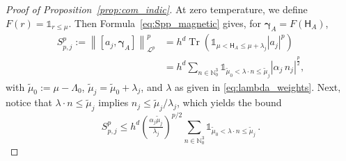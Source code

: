 \documentclass[11pt]{amsart}
\theoremstyle{plain}
\theoremstyle{definition}
\newcommand		{\N}		{\mathbb N}			%
\renewcommand	{\L}		{\mathcal L}		%
\newcommand		\sfH		{\mathsf H}			%
\newcommand		{\lt}			{\left}				%
\newcommand		{\rt}			{\right}			%
\renewcommand	{\(}			{\lt(}
\renewcommand	{\)}			{\rt)}
\newcommand		{\com}[1]		{\lt[{#1}\rt]}		%
\newcommand		{\n}[1]			{\lt\lvert #1 \rt\rvert}
\newcommand		{\nrm}[1]		{\lt\lVert #1\rt\rVert}
\newcommand		{\Nrm}[2]		{\nrm{#1}_{#2}}
\newcommand		{\indic}	{\mathds{1}}		%
\DeclareMathOperator{\tr}		{Tr}				%
\newcommand		{\Tr}[1]		{\tr\!\( #1 \)}		%
\newcommand		{\hd}		{h^d}
\newcommand		{\opgam}	{{\boldsymbol{\gamma}}}	%
\begin{document}
    \begin{proof}[Proof of Proposition~\ref{prop:com_indic}]
        At zero temperature, we define $F(r) = \indic_{r\leq\mu}$. Then Formula~\eqref{eq:Spp_magnetic} gives, for $\opgam_{A} = F(\sfH_A)$,
        \begin{equation}\label{eq:Spp_magnetic_0}
            \begin{aligned}
                S_{p, j}^p := \Nrm{\com{a_j,\opgam_{A}}}{\L^p}^p &= \hd \Tr{\indic_{\mu< \sfH_A\leq \mu+\lambda_j} \n{a_j}^p} \\
                &= \hd\sum_{n\in \N_0^3} \indic_{\tilde{\mu}_0 < \lambda\cdot n \leq \tilde{\mu}_j} \n{\alpha_j \, n_j}^\frac{p}{2},
            \end{aligned}
        \end{equation}
        with $\tilde{\mu}_0 := \mu - \Lambda_0$, $\tilde{\mu}_j = \tilde{\mu}_0 + \lambda_j$, and $\lambda$ as given in \eqref{eq:lambda_weights}.  Next, notice that $\lambda\cdot n\leq \tilde{\mu}_j$ implies $n_j\leq \tilde{\mu}_j/\lambda_j$, which yields the bound
        \begin{equation*}
            S_{p, j}^p \leq \hd\lt(\tfrac{\alpha_j\tilde{\mu}_j}{\lambda_j}\rt)^{p/2} \sum_{n\in \N_0^3} \indic_{\tilde{\mu}_0 < \lambda\cdot n\leq \tilde{\mu}_j} \, .
        \end{equation*}
        

\end{proof}
\end{document}

